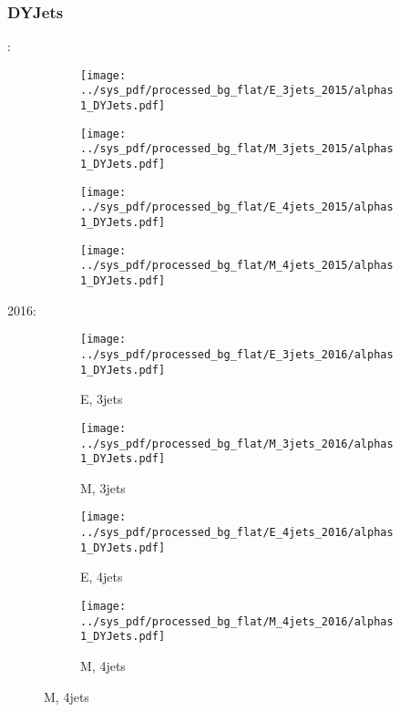 \documentclass{beamer}
\begin{document}
\begin{frame}
\frametitle{DYJets}
\fontsize{5}{1}:
\begin{figure}
\centering
\begin{subfigure}[b]{0.24\textwidth}
\texttt{[image: ../sys\_pdf/processed\_bg\_flat/E\_3jets\_2015/alphas1\_DYJets.pdf]}
\end{subfigure}
\begin{subfigure}[b]{0.24\textwidth}
\texttt{[image: ../sys\_pdf/processed\_bg\_flat/M\_3jets\_2015/alphas1\_DYJets.pdf]}
\end{subfigure}
\begin{subfigure}[b]{0.24\textwidth}
\texttt{[image: ../sys\_pdf/processed\_bg\_flat/E\_4jets\_2015/alphas1\_DYJets.pdf]}
\end{subfigure}
\begin{subfigure}[b]{0.24\textwidth}
\texttt{[image: ../sys\_pdf/processed\_bg\_flat/M\_4jets\_2015/alphas1\_DYJets.pdf]}
\end{subfigure}
\end{figure}
2016:
\begin{figure}
\centering
\begin{subfigure}[b]{0.24\textwidth}
\texttt{[image: ../sys\_pdf/processed\_bg\_flat/E\_3jets\_2016/alphas1\_DYJets.pdf]}
\captionsetup{font=tiny}
\caption{E, 3jets}
\end{subfigure}
\begin{subfigure}[b]{0.24\textwidth}
\texttt{[image: ../sys\_pdf/processed\_bg\_flat/M\_3jets\_2016/alphas1\_DYJets.pdf]}
\captionsetup{font=tiny}
\caption{M, 3jets}
\end{subfigure}
\begin{subfigure}[b]{0.24\textwidth}
\texttt{[image: ../sys\_pdf/processed\_bg\_flat/E\_4jets\_2016/alphas1\_DYJets.pdf]}
\captionsetup{font=tiny}
\caption{E, 4jets}
\end{subfigure}
\begin{subfigure}[b]{0.24\textwidth}
\texttt{[image: ../sys\_pdf/processed\_bg\_flat/M\_4jets\_2016/alphas1\_DYJets.pdf]}
\captionsetup{font=tiny}
\caption{M, 4jets}
\end{subfigure}
\end{figure}
\end{frame}
\end{document}
